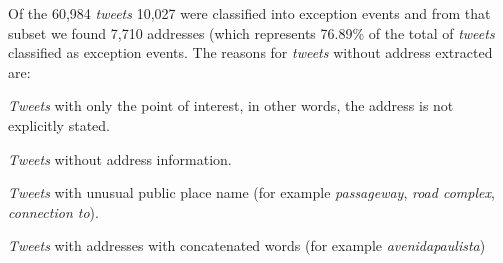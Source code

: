 \documentclass[runningheads]{llncs}
\begin{document}

Of the 60,984 \textit{tweets} 10,027 were classified into exception events and from that subset we found 7,710 addresses
(which represents 76.89\% of the total of \textit{tweets} classified as exception events. The reasons for \textit {tweets} without address extracted are:

\begin{enumerate*}
\item \textit{Tweets} with only the point of interest, in other words, the address is not explicitly stated.
\item \textit{Tweets} without address information.
\item \textit{Tweets} with unusual public place name (for example \emph{passageway}, \emph{road complex}, \emph{connection to}).
\item \textit{Tweets} with addresses with concatenated words (for example \emph{avenidapaulista})
\end{enumerate*}

\end{document}
